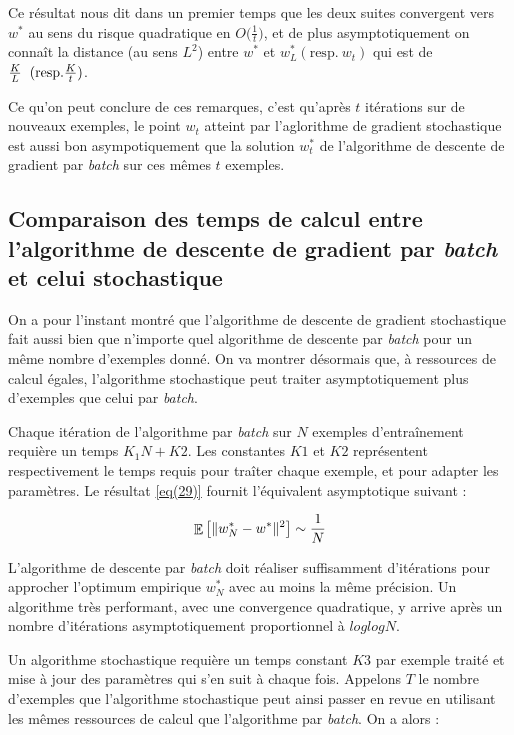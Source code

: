 \documentclass{article}
\DeclareMathOperator*{\E}{\mathbb{E}} %
\begin{document}
Ce résultat nous dit dans un premier temps que les deux suites convergent vers $w^*$ au sens du risque quadratique en $O\Big(\frac{1}{t}\Big)$, et de plus asymptotiquement on connaît la distance (au sens $L^2$) entre $w^*$ et $w_L^*(\text{resp}.~w_t)$ qui est de $\frac{K}{L}\hspace{0.2cm}(\text{resp.}\frac{K}{t})$.
\bigskip

Ce qu'on peut conclure de ces remarques, c'est qu'après $t$ itérations sur de nouveaux exemples, le point $w_t$ atteint par l'aglorithme de gradient stochastique est aussi bon asympotiquement que la solution $w_t^*$ de l'algorithme de descente de gradient par \emph{batch} sur ces mêmes $t$ exemples.
\subsection{Comparaison des temps de calcul entre l'algorithme de descente de gradient par \emph{batch} et celui stochastique}

On a pour l'instant montré que l'algorithme de descente de gradient stochastique fait aussi bien que n'importe quel algorithme de descente par \emph{batch} pour un même nombre d'exemples donné. On va montrer désormais que, à ressources de calcul égales, l'algorithme stochastique peut traiter asymptotiquement plus d'exemples que celui par \emph{batch}. 
\bigskip

Chaque itération de l'algorithme par \emph{batch} sur $N$ exemples d'entraînement requière un temps $K_1 N + K2$. Les constantes $K1$ et $K2$ représentent respectivement le temps requis pour traîter chaque exemple, et pour adapter les paramètres.
Le résultat \eqref{eq(29)} fournit l'équivalent asymptotique suivant : 

\begin{equation*}
    \E \big{[}\lVert w_N^* - w^* \rVert^2\big{]} \sim \frac{1}{N}
\end{equation*}

L'algorithme de descente par \emph{batch} doit réaliser suffisamment d'itérations pour approcher l'optimum empirique $w_N^*$ avec au moins la même précision. Un algorithme très performant, avec une convergence quadratique, y arrive après un nombre d'itérations asymptotiquement proportionnel à $loglogN$.
\bigskip

Un algorithme stochastique requière un temps constant $K3$ par exemple traité et mise à jour des paramètres qui s'en suit à chaque fois. Appelons $T$ le nombre d'exemples que l'algorithme stochastique peut ainsi passer en revue en utilisant les mêmes ressources de calcul que l'algorithme par \emph{batch}. On a alors :
\end{document}
